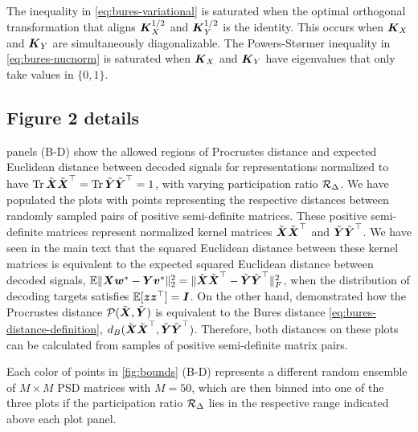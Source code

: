 The inequality in \cref{eq:bures-variational} is saturated when the optimal orthogonal transformation that aligns $\boldsymbol{K}_X^{1/2}$ and $\boldsymbol{K}_Y^{1/2}$ is the identity. 
This occurs when $\boldsymbol{K}_X$ and $\boldsymbol{K}_Y$ are simultaneously diagonalizable.  
The Powers-St\o rmer inequality in \cref{eq:bures-nucnorm} is saturated when $\boldsymbol{K}_X$ and $\boldsymbol{K}_Y$ have eigenvalues that only take values in $\{ 0, 1 \}$.


\subsection{Figure 2 details}\label{appendix:fig2}

 panels (B-D) show the allowed regions of Procrustes distance and expected Euclidean distance between decoded signals for representations normalized to have $\operatorname*{Tr} \tilde{\boldsymbol{X}}\tilde{\boldsymbol{X}}^\top = \operatorname*{Tr} \tilde{\boldsymbol{Y}} \tilde{\boldsymbol{Y}}^\top = 1$, with varying participation ratio $\mathcal{R}_\Delta$.  
We have populated the plots with points representing the respective distances between randomly sampled pairs of positive semi-definite matrices. 
These positive semi-definite matrices represent normalized kernel matrices $\tilde{\boldsymbol{X}}\tilde{\boldsymbol{X}}^\top$ and $\tilde{\boldsymbol{Y}} \tilde{\boldsymbol{Y}}^\top$. 
We have seen in the main text that the squared Euclidean distance between these kernel matrices is equivalent to the expected squared Euclidean distance between decoded signals, $\mathbb{E} \Vert \boldsymbol{X} \boldsymbol{w}^* - \boldsymbol{Y} \boldsymbol{v}^* \Vert^2_2 = \Vert \tilde{\boldsymbol{X}} \tilde{\boldsymbol{X}}^\top - \tilde{\boldsymbol{Y}} \tilde{\boldsymbol{Y}}^\top  \Vert_F^2$, when the distribution of decoding targets satisfies $\mathbb{E}[\boldsymbol{z} \boldsymbol{z}^\top] = \boldsymbol{I}$.
On the other hand, \cite{Harvey2024} demonstrated how the Procrustes distance $\mathcal{P} (\tilde{\boldsymbol{X}}, \tilde{\boldsymbol{Y}})$ is equivalent to the Bures distance \cref{eq:bures-distance-definition}, $d_B(\tilde{\boldsymbol{X}} \tilde{\boldsymbol{X}}^\top, \tilde{\boldsymbol{Y}} \tilde{\boldsymbol{Y}}^\top)$.  
Therefore, both distances on these plots can be calculated from samples of positive semi-definite matrix pairs.  

Each color of points in \cref{fig:bounds} (B-D) represents a different random ensemble of $M \times M$ PSD matrices with $M=50$, which are then binned into one of the three plots if the participation ratio $\mathcal{R}_\Delta$ lies in the respective range indicated above each plot panel.  

